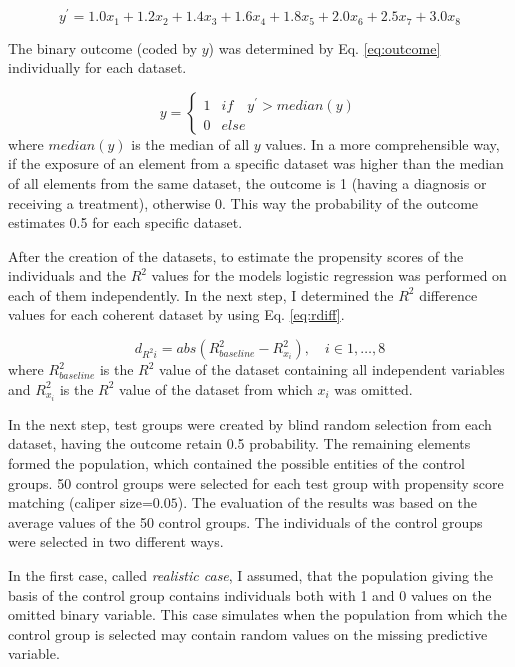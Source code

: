 		\begin{equation}
			y^{'} = 1.0x_1 + 1.2x_2 + 1.4x_3 + 1.6x_4 + 1.8x_5 + 2.0x_6 + 2.5x_7 + 3.0x_8
			\label{eq:utility}
		\end{equation}

        The binary outcome (coded by $y$) was determined by Eq. \ref{eq:outcome} individually for each dataset.
      
		\begin{equation}
			y=\left\{\begin{matrix}
			1 & if \quad y^{'}>median(y)\\ 
			0 & else
			\end{matrix}\right.
			\label{eq:outcome}
		\end{equation}
		where $median(y)$ is the median of all $y$ values. In a more comprehensible way, if the exposure of an element from a specific dataset was higher than the median of all elements from the same dataset, the outcome is 1 (having a diagnosis or receiving a treatment), otherwise 0. This way the probability of the outcome estimates 0.5 for each specific dataset.
								
		After the creation of the datasets, to estimate the propensity scores of the individuals and the $R^2$ values for the models logistic regression was performed on each of them independently. In the next step, I determined the $R^2$ difference values for each coherent dataset by using Eq. \ref{eq:rdiff}.
								
		\begin{equation}
			d_{R^{2}i}=abs(R_{baseline}^{2}-R_{x_i}^{2}), \quad i \in {1,\dots,8}
			\label{eq:rdiff}
		\end{equation}
		where $R_{baseline}^{2}$ is the $R^2$ value of the dataset containing all independent variables and $R_{x_i}^{2}$ is the $R^2$ value of the dataset from which $x_i$ was omitted.
								
		In the next step, test groups were created by blind random selection from each dataset, having the outcome retain 0.5 probability. The remaining elements formed the population, which contained the possible entities of the control groups. 50 control groups were selected for each test group with propensity score matching (caliper size=$0.05$). The evaluation of the results was based on the average values of the 50 control groups. The individuals of the control groups were selected in two different ways.
     
		In the first case, called \textit{realistic case}, I assumed, that the population giving the basis of the control group contains individuals both with 1 and 0 values on the omitted binary variable. This case simulates when the population from which the control group is selected may contain random values on the missing predictive variable.
								
